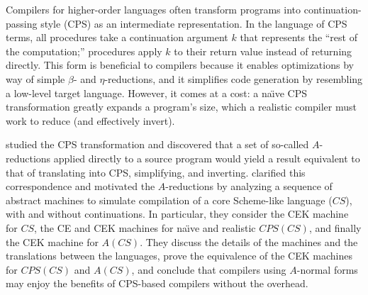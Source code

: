 \documentclass[11pt]{article}
\begin{document}
\thispagestyle{fancy}

Compilers for higher-order languages often transform programs into
continuation-passing style (CPS) as an intermediate representation. In the
language of CPS terms, all procedures take a continuation argument $k$
that represents the ``rest of the computation;'' procedures apply $k$ to their
return value instead of returning directly. This form is beneficial to
compilers because it enables optimizations by way of simple $\beta$- and
$\eta$-reductions, and it simplifies code generation by resembling a low-level
target language. However, it comes at a cost: a na\"{\i}ve CPS transformation
greatly expands a program's size, which a realistic compiler must work to
reduce (and effectively invert).

\citet{Sabry:1992zr} studied the CPS transformation and discovered that a set
of so-called $A$-reductions applied directly to a source program would yield
a result equivalent  to that of translating into CPS, simplifying,
and inverting. \citet{Flanagan:1993fk} clarified this correspondence and
motivated the $A$-reductions by analyzing a sequence of abstract machines to
simulate compilation of a core Scheme-like language ($\mathit{CS}$), with and
without continuations. In particular, they consider the CEK machine for
$\mathit{CS}$, the CE and CEK machines for na\"{\i}ve and realistic
$\mathit{CPS}(\mathit{CS})$, and finally the CEK machine for $A(\mathit{CS})$.
They discuss the details of the machines and the translations between the
languages, prove the equivalence of the CEK machines for
$\mathit{CPS}(\mathit{CS})$ and $A(\mathit{CS})$, and conclude that compilers
using $A$-normal forms may enjoy the benefits of CPS-based compilers without
the overhead.

\end{document}
